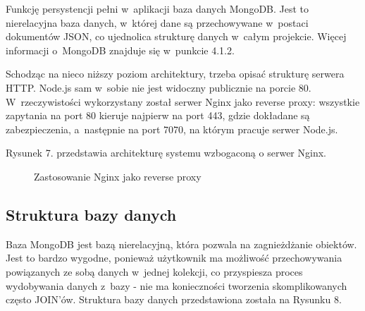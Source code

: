 \documentclass[12pt,a4paper,notitlepage]{article}
\begin{document}
\par Funkcję persystencji pełni w~aplikacji baza danych MongoDB. Jest to nierelacyjna baza danych, w~której dane są przechowywane w~postaci dokumentów JSON, co ujednolica strukturę danych w~całym projekcie. Więcej informacji o~MongoDB znajduje się w~punkcie 4.1.2.

\par Schodząc na nieco niższy poziom architektury, trzeba opisać strukturę serwera HTTP. Node.js sam w~sobie nie jest widoczny publicznie na porcie 80. W~rzeczywistości wykorzystany został serwer Nginx jako reverse proxy: wszystkie zapytania na port 80 kieruje najpierw na port 443, gdzie dokładane są zabezpieczenia, a~następnie na port 7070, na którym pracuje serwer Node.js.
\par Rysunek 7. przedstawia architekturę systemu wzbogaconą o serwer Nginx.

\begin{figure}[H]
\begin{center}
\caption{Zastosowanie Nginx jako reverse proxy}
\end{center}
\end{figure}

\subsection{Struktura bazy danych}
Baza MongoDB jest bazą nierelacyjną, która pozwala na zagnieżdżanie obiektów. Jest to bardzo wygodne, ponieważ użytkownik ma możliwość przechowywania powiązanych ze sobą danych w~jednej kolekcji, co przyspiesza proces wydobywania danych z~bazy - nie ma konieczności tworzenia skomplikowanych często JOIN'ów. Struktura bazy danych przedstawiona została na Rysunku 8.
\end{document}
